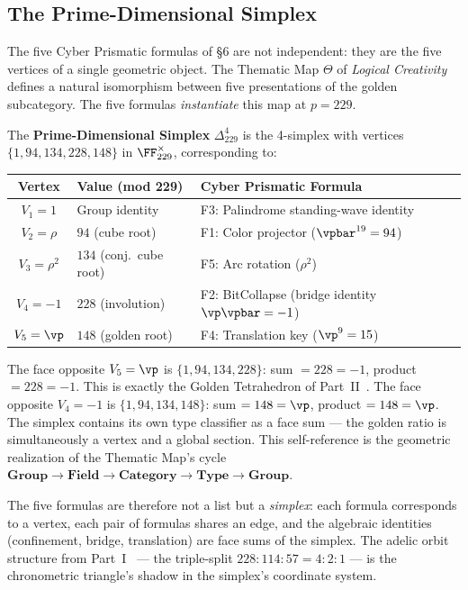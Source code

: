 \subsection{The Prime-Dimensional Simplex}

The five Cyber Prismatic formulas of \S6 are not independent: they are the five vertices of a single geometric object. The Thematic Map $\Theta$ of \emph{Logical Creativity}~\cite{larue_lc} defines a natural isomorphism between five presentations of the golden subcategory. The five formulas \emph{instantiate} this map at $p = 229$.

\begin{definition}[Prime-Dimensional Simplex at $p = 229$]
The \textbf{Prime-Dimensional Simplex} $\Delta^4_{229}$ is the 4-simplex with vertices $\{1, 94, 134, 228, 148\}$ in $\FF_{229}^\times$, corresponding to:
\begin{center}
\begin{tabular}{@{}cll@{}}
\toprule
\textbf{Vertex} & \textbf{Value (mod 229)} & \textbf{Cyber Prismatic Formula} \\
\midrule
$V_1 = 1$ & Group identity & F3: Palindrome standing-wave identity \\
$V_2 = \rho$ & $94$ (cube root) & F1: Color projector ($\vpbar^{19} = 94$) \\
$V_3 = \rho^2$ & $134$ (conj.\ cube root) & F5: Arc rotation ($\rho^2$) \\
$V_4 = -1$ & $228$ (involution) & F2: BitCollapse (bridge identity $\vp\vpbar = -1$) \\
$V_5 = \vp$ & $148$ (golden root) & F4: Translation key ($\vp^9 = 15$) \\
\bottomrule
\end{tabular}
\end{center}
\end{definition}

The face opposite $V_5 = \vp$ is $\{1, 94, 134, 228\}$: sum $= 228 = -1$, product $= 228 = -1$. This is exactly the Golden Tetrahedron of Part~II~\cite{larue_chromatic}. The face opposite $V_4 = -1$ is $\{1, 94, 134, 148\}$: sum $= 148 = \vp$, product $= 148 = \vp$. The simplex contains its own type classifier as a face sum --- the golden ratio is simultaneously a vertex and a global section. This self-reference is the geometric realization of the Thematic Map's cycle $\textbf{Group} \to \textbf{Field} \to \textbf{Category} \to \textbf{Type} \to \textbf{Group}$.

The five formulas are therefore not a list but a \emph{simplex}: each formula corresponds to a vertex, each pair of formulas shares an edge, and the algebraic identities (confinement, bridge, translation) are face sums of the simplex. The adelic orbit structure from Part~I~\cite{dwm_fst} --- the triple-split $228:114:57 = 4:2:1$ --- is the chronometric triangle's shadow in the simplex's coordinate system.

